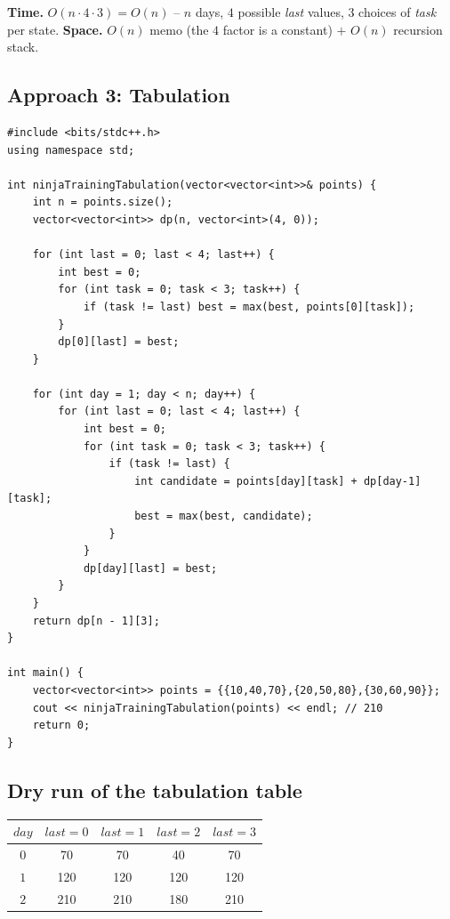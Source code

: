 \begin{complexitybox}
\textbf{Time.} $O(n \cdot 4 \cdot 3) = O(n)$ -- $n$ days, $4$ possible
\textit{last} values, $3$ choices of \textit{task} per state.
\textbf{Space.} $O(n)$ memo (the $4$ factor is a constant) $+$ $O(n)$
recursion stack.
\end{complexitybox}

\subsection*{Approach 3: Tabulation}

\begin{lstlisting}
#include <bits/stdc++.h>
using namespace std;

int ninjaTrainingTabulation(vector<vector<int>>& points) {
    int n = points.size();
    vector<vector<int>> dp(n, vector<int>(4, 0));

    for (int last = 0; last < 4; last++) {
        int best = 0;
        for (int task = 0; task < 3; task++) {
            if (task != last) best = max(best, points[0][task]);
        }
        dp[0][last] = best;
    }

    for (int day = 1; day < n; day++) {
        for (int last = 0; last < 4; last++) {
            int best = 0;
            for (int task = 0; task < 3; task++) {
                if (task != last) {
                    int candidate = points[day][task] + dp[day-1][task];
                    best = max(best, candidate);
                }
            }
            dp[day][last] = best;
        }
    }
    return dp[n - 1][3];
}

int main() {
    vector<vector<int>> points = {{10,40,70},{20,50,80},{30,60,90}};
    cout << ninjaTrainingTabulation(points) << endl; // 210
    return 0;
}
\end{lstlisting}

\subsection*{Dry run of the tabulation table}


\begin{center}
\begin{tabular}{c|c|c|c|c}
$\textit{day}$ & $\textit{last}=0$ & $\textit{last}=1$ &
$\textit{last}=2$ & $\textit{last}=3$ \\ \hline
$0$ & 70 & 70 & 40 & 70 \\ \hline
$1$ & 120 & 120 & 120 & 120 \\ \hline
$2$ & 210 & 210 & 180 & 210
\end{tabular}
\end{center}

